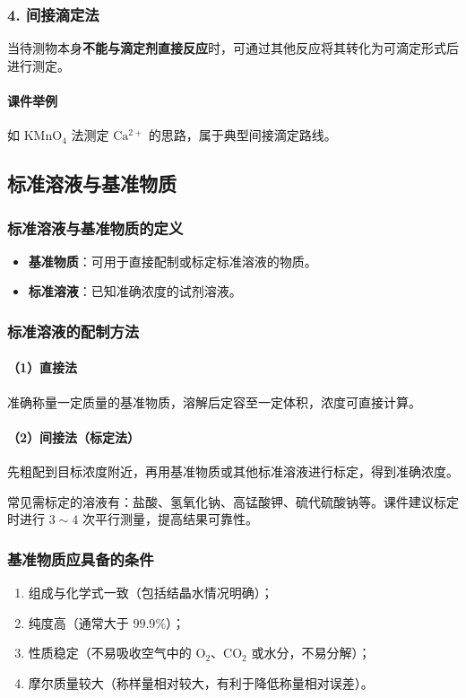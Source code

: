 \documentclass[12pt,a4paper]{article}
\numberwithin{equation}{section}
\begin{document}
\subsubsection{4. 间接滴定法}
当待测物本身\textbf{不能与滴定剂直接反应}时，可通过其他反应将其转化为可滴定形式后进行测定。

\paragraph{课件举例}
如 $\mathrm{KMnO_4}$ 法测定 $\mathrm{Ca^{2+}}$ 的思路，属于典型间接滴定路线。

\subsection{标准溶液与基准物质}

\subsubsection{标准溶液与基准物质的定义}
\begin{itemize}
    \item \textbf{基准物质}：可用于直接配制或标定标准溶液的物质。
    \item \textbf{标准溶液}：已知准确浓度的试剂溶液。
\end{itemize}

\subsubsection{标准溶液的配制方法}

\paragraph{（1）直接法}
准确称量一定质量的基准物质，溶解后定容至一定体积，浓度可直接计算。

\paragraph{（2）间接法（标定法）}
先粗配到目标浓度附近，再用基准物质或其他标准溶液进行标定，得到准确浓度。

常见需标定的溶液有：盐酸、氢氧化钠、高锰酸钾、硫代硫酸钠等。课件建议标定时进行 $3\sim4$ 次平行测量，提高结果可靠性。

\subsubsection{基准物质应具备的条件}
\begin{enumerate}
    \item 组成与化学式一致（包括结晶水情况明确）；
    \item 纯度高（通常大于 $99.9\%$）；
    \item 性质稳定（不易吸收空气中的 $\mathrm{O_2}$、$\mathrm{CO_2}$ 或水分，不易分解）；
    \item 摩尔质量较大（称样量相对较大，有利于降低称量相对误差）。
\end{enumerate}
\end{document}
